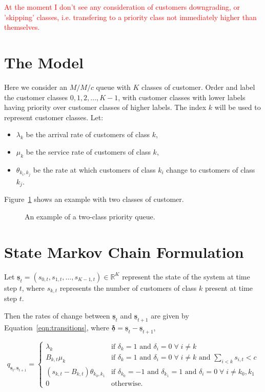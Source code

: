 \documentclass{article}
\begin{document}
\textcolor{red}{At the moment I don't see any consideration of customers downgrading, or 'skipping' classes, i.e. transfering to a priority class not immediately higher than themselves.}

\section{The Model}
Here we consider an $M/M/c$ queue with $K$ classes of customer.
Order and label the customer classes $0, 1, 2, \dots, K-1$, with customer
classes with lower labels having priority over customer classes of higher
labels. The index $k$ will be used to represent customer classes.
Let:

\begin{itemize}
  \item $\lambda_k$ be the arrival rate of customers of class $k$,
  \item $\mu_k$ be the service rate of customers of class $k$,
  \item $\theta_{k_i,k_j}$ be the rate at which customers of class $k_i$ change
  to customers of class $k_j$.
\end{itemize}

Figure~\ref{fig:twoclass_example} shows an example with two classes of customer.

\begin{figure}
\begin{center}

\end{center}
\caption{An example of a two-class priority queue.}
\label{fig:twoclass_example}
\end{figure}


\section{State Markov Chain Formulation}
Let
$\underline{\mathbf{s}}_t = (s_{0,t}, s_{1,t}, \dots, s_{K-1,t}) \in \mathbb{R}^K$
represent the state of the system at time step $t$, where $s_{k,t}$ represents
the number of customers of class $k$ present at time step $t$.

Then the rates of change between $\underline{\mathbf{s}}_t$ and
$\underline{\mathbf{s}}_{t+1}$ are given by Equation~\ref{eqn:transitions},
where $\underline{\mathbf{\delta}} = \underline{\mathbf{s}}_t - \underline{\mathbf{s}}_{t+1}$,

\begin{equation}\label{eqn:transitions}
q_{\underline{\mathbf{s}}_t, \underline{\mathbf{s}}_{t+1}} = 
\begin{cases}
\lambda_k & \text{if } \delta_k = 1 \text{ and } \delta_i = 0 \; \forall \; i \neq k \\
B_{k,t} \mu_k & \text{if } \delta_k = 1 \text{ and } \delta_i = 0 \; \forall \; i \neq k \text{ and } \sum_{i < k} s_{i,t} < c \\
(s_{k,t} - B_{k,t}) \theta_{k_0,k_1} & \text{if } \delta_{k_0} = -1 \text{ and } \delta_{k_1} = 1 \text{ and } \delta_i = 0 \; \forall \; i \neq k_0, k_1 \\
0 & \text{otherwise.}
\end{cases}
\end{equation}
\end{document}
